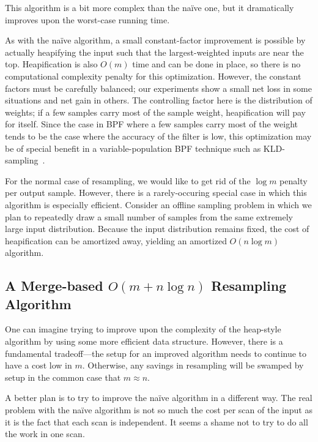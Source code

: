 \documentclass[12pt]{article}
\begin{document}
  This algorithm is a bit more complex than the na\"ive one,
  but it dramatically improves upon the worst-case running
  time.

  As with the na\"ive algorithm, a small constant-factor
  improvement is possible by actually heapifying the input
  such that the largest-weighted inputs are near the top.
  Heapification is also $O(m)$ time and can be done in
  place, so there is no computational complexity penalty for
  this optimization.  However, the constant factors must be
  carefully balanced; our experiments show a small net loss
  in some situations and net gain in others.  The
  controlling factor here is the distribution of weights; if
  a few samples carry most of the sample weight,
  heapification will pay for itself.  Since the case in BPF where a
  few samples carry most of the weight tends to be the case where the
  accuracy of the filter is low, this optimization may be of
  special benefit in a variable-population BPF technique
  such as KLD-sampling~\cite{kld}.

  For the normal case of resampling, we would like to get
  rid of the $\log m$ penalty per output sample.  However,
  there is a rarely-occuring special case in which this
  algorithm is especially efficient.  Consider an offline
  sampling problem in which we plan to repeatedly draw a
  small number of samples from the same extremely large
  input distribution.  Because the input distribution
  remains fixed, the cost of heapification can be amortized
  away, yielding an amortized $O(n \log m)$ algorithm.

\subsection{A Merge-based $O(m + n \log n)$ Resampling Algorithm}\label{sec-merge}

  One can imagine trying to improve upon the complexity of
  the heap-style algorithm by using some more efficient data
  structure.  However, there is a fundamental tradeoff---the
  setup for an improved algorithm needs to continue to have
  a cost low in $m$.  Otherwise, any savings in resampling
  will be swamped by setup in the common case that $m
  \approx n$.

  A better plan is to try to improve the na\"ive algorithm
  in a different way.  The real problem with the na\"ive
  algorithm is not so much the cost per scan of the input as it is the
  fact that each scan is independent.  It seems a shame not
  to try to do all the work in one scan.
\end{document}
